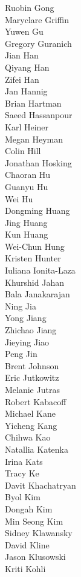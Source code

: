 Ruobin Gong\\
Maryclare Griffin\\
Yuwen Gu\\
Gregory Guranich\\
Jian Han\\
Qiyang Han\\
Zifei Han\\
Jan Hannig\\
Brian Hartman\\
Saeed Hassanpour\\
Karl Heiner\\
Megan Heyman\\
Colin Hill\\
Jonathan Hosking\\
Chaoran Hu\\
Guanyu Hu\\
Wei Hu\\
Dongming Huang\\
Jing Huang\\
Kun Huang\\
Wei-Chun Hung\\
Kristen Hunter\\
Iuliana Ionita-Laza\\
Khurshid Jahan\\
Bala Janakarajan\\
Ning Jia\\
Yong Jiang\\
Zhichao Jiang\\
Jieying Jiao\\
Peng Jin\\
Brent Johnson\\
Eric Jutkowitz\\
Melanie Jutras\\
Robert Kabacoff\\
Michael Kane\\
Yicheng Kang\\
Chihwa Kao\\
Natallia Katenka\\
Irina Kats\\
Tracy Ke\\
Davit Khachatryan\\
Byol Kim\\
Dongah Kim\\
Min Seong Kim\\
Sidney Klawansky\\
David Kline\\
Jason Klusowski\\
Kriti Kohli\\
